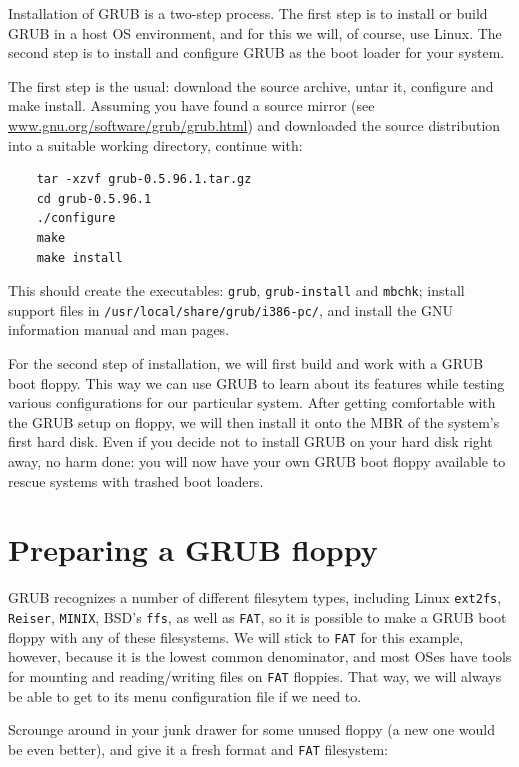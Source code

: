 \documentclass{article}
\begin{document}
Installation of GRUB is a two-step process. The first step is to install or build GRUB in a host OS environment, and for this we will, of course, use Linux. The second step is to install and configure GRUB as the boot loader for your system.

The first step is the usual: download the source archive, untar it, configure and make install. Assuming you have found a source mirror (see \href{www.gnu.org/software/grub/grub.html}{www.gnu.org/software/grub/grub.html}) and downloaded the source distribution into a suitable working directory, continue with:

\begin{verbatim}
    tar -xzvf grub-0.5.96.1.tar.gz
    cd grub-0.5.96.1
    ./configure
    make
    make install
\end{verbatim}

This should create the executables:
\texttt{grub}, \texttt{grub-install} and \texttt{mbchk};
install support files in \texttt{/usr/local/share/grub/i386-pc/},
and install the GNU information manual and man pages.

For the second step of installation, we will first build and work with a GRUB boot floppy. This way we can use GRUB to learn about its features while testing various configurations for our particular system. After getting comfortable with the GRUB setup on floppy, we will then install it onto the MBR of the system's first hard disk. Even if you decide not to install GRUB on your hard disk right away, no harm done: you will now have your own GRUB boot floppy available to rescue systems with trashed boot loaders.

\section{Preparing a GRUB floppy}

GRUB recognizes a number of different filesytem types,
including Linux \texttt{ext2fs}, \texttt{Reiser}, \texttt{MINIX}, BSD's \texttt{ffs}, as well as \texttt{FAT},
so it is possible to make a GRUB boot floppy with any of these filesystems. We will stick to \texttt{FAT} for this example, however, because it is the lowest common denominator, and most OSes have tools for mounting and reading/writing files on \texttt{FAT} floppies. That way, we will always be able to get to its menu configuration file if we need to.

Scrounge around in your junk drawer for some unused floppy (a new one would be even better), and give it a fresh format and \texttt{FAT} filesystem:
\end{document}
